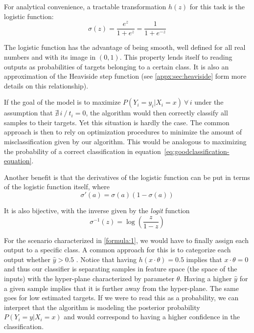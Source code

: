 For analytical convenience, a tractable transformation $h(z)$ for this task is the logistic function:
\begin{equation}
\sigma(z) = \frac{e^{z}}{1 + e^{z}} = \frac{1}{1 + e^{-z}}
\label{eq:logisticFunction}
\end{equation}

The logistic function has the advantage of being smooth, well defined for all real numbers and with its image in $(0,1)$.
This property lends itself to reading outputs as probabilities of targets belonging to a certain class.
It is also an approximation of the Heaviside step function (see \cref{appx:sec:heaviside} form more details on this relationship).


If the goal of the model is to maximize $P(Y_i = y_i | X_i = x) \ \forall \, i$
under the assumption that $\nexists\, i \ / \ t_i = 0$, the algorithm would then correctly classify all samples to their targets.
Yet this situation is hardly the case.
The common approach is then to rely on optimization procedures to minimize the amount of misclassification given by our algorithm.
This would be analogous to maximizing the probability of a correct classification in equation~\eqref{eq:goodclassification-equation}.


Another benefit is that the derivatives of the logistic function can be put in terms of the logistic function itself, where
\begin{equation}
\sigma '(a) = \sigma(a)( 1 - \sigma(a) )
\label{eq:derivativeLogisticFunction}
\end{equation}

It is also bijective, with the inverse given by the \textit{logit} function
\begin{equation}
\sigma^{-1}(z) = \log \left( \frac{z}{1 - z} \right)
\label{eq:logitFunction}
\end{equation}

For the scenario characterized in \cref{formula:1}, we would have to finally assign each output to a specific class.
A common approach for this is to categorize each output whether $\hat{y} > 0.5$ \label{formula:logitThreshold}.
Notice that having $h(x \cdot \theta) = 0.5$ implies that $x \cdot \theta = 0$ and thus our classifier is separating samples in feature space (the space of the inputs) with the hyper-plane characterized by parameter $\theta$.
Having a higher $\hat{y}$ for a given sample implies that it is further away from the hyper-plane.
The same goes for low estimated targets.
If we were to read this as a probability, we can interpret that the algorithm is modeling the posterior probability $P(Y_i = y | X_i = x)$ and would correspond to having a higher confidence in the classification.

